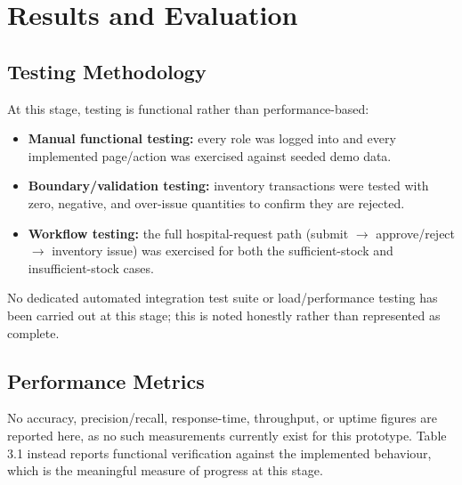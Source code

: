 \documentclass[12pt,twoside]{report}
\begin{document}
\chapter{Results and Evaluation}

\section{Testing Methodology}

At this stage, testing is functional rather than performance-based:

\begin{itemize}
\item \textbf{Manual functional testing:} every role was logged into and every implemented page/action was exercised against seeded demo data.
\item \textbf{Boundary/validation testing:} inventory transactions were tested with zero, negative, and over-issue quantities to confirm they are rejected.
\item \textbf{Workflow testing:} the full hospital-request path (submit $\rightarrow$ approve/reject $\rightarrow$ inventory issue) was exercised for both the sufficient-stock and insufficient-stock cases.
\end{itemize}

No dedicated automated integration test suite or load/performance testing has been carried out at this stage; this is noted honestly rather than represented as complete.

\section{Performance Metrics}

No accuracy, precision/recall, response-time, throughput, or uptime figures are reported here, as no such measurements currently exist for this prototype. Table 3.1 instead reports functional verification against the implemented behaviour, which is the meaningful measure of progress at this stage.
\end{document}
